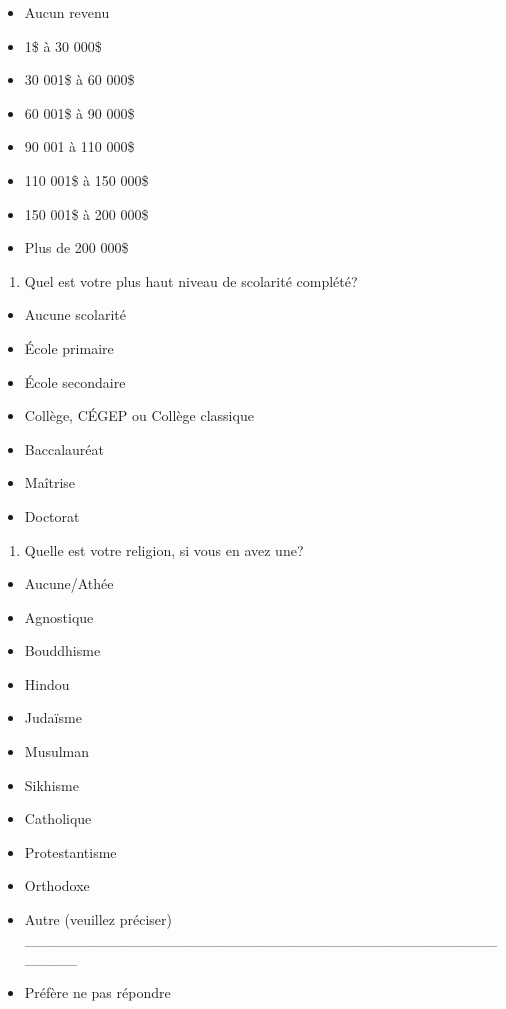 \documentclass[
  letterpaper,
  DIV=11,
  numbers=noendperiod]{scrreprt}
\providecommand{\tightlist}{%
  \setlength{\itemsep}{0pt}\setlength{\parskip}{0pt}}\usepackage{longtable,booktabs,array}
\begin{document}
\begin{itemize}
\tightlist
\item
  Aucun revenu
\item
  1\$ à 30 000\$
\item
  30 001\$ à 60 000\$
\item
  60 001\$ à 90 000\$
\item
  90 001 à 110 000\$
\item
  110 001\$ à 150 000\$
\item
  150 001\$ à 200 000\$
\item
  Plus de 200 000\$
\end{itemize}

\begin{enumerate}
\def\labelenumi{\arabic{enumi}.}
\setcounter{enumi}{6}
\tightlist
\item
  Quel est votre plus haut niveau de scolarité complété?
\end{enumerate}

\begin{itemize}
\tightlist
\item
  Aucune scolarité
\item
  École primaire
\item
  École secondaire
\item
  Collège, CÉGEP ou Collège classique
\item
  Baccalauréat
\item
  Maîtrise
\item
  Doctorat
\end{itemize}

\begin{enumerate}
\def\labelenumi{\arabic{enumi}.}
\setcounter{enumi}{7}
\tightlist
\item
  Quelle est votre religion, si vous en avez une?
\end{enumerate}

\begin{itemize}
\tightlist
\item
  Aucune/Athée
\item
  Agnostique
\item
  Bouddhisme
\item
  Hindou
\item
  Judaïsme
\item
  Musulman
\item
  Sikhisme
\item
  Catholique
\item
  Protestantisme
\item
  Orthodoxe
\item
  Autre (veuillez préciser)
  \_\_\_\_\_\_\_\_\_\_\_\_\_\_\_\_\_\_\_\_\_\_\_\_\_\_\_\_\_\_\_\_\_\_\_\_\_\_\_\_\_\_\_\_\_\_\_\_\_\_
\item
  Préfère ne pas répondre
\end{itemize}
\end{document}

